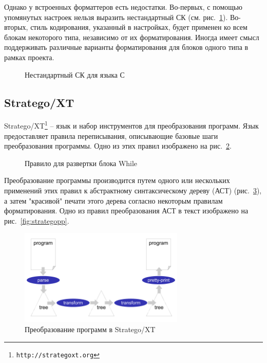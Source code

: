 Однако у встроенных форматтеров есть недостатки. Во-первых, с помощью упомянутых настроек нельзя выразить нестандартный СК (см. рис.~\ref{fig:unusualCC}). 
Во-вторых, стиль кодирования, указанный в настройках, будет применен ко всем блокам некоторого типа, независимо от их форматирования. 
Иногда имеет смысл поддерживать различные варианты форматирования для блоков одного типа в рамках проекта. %

\begin{figure}[h]
	\centering
	
	\caption{Нестандартный СК для языка С}
	\label{fig:unusualCC}
\end{figure}

\subsection{Stratego/XT}
Stratego/XT\footnote{\texttt{http://strategoxt.org}} -- язык и набор инструментов для преобразования программ. Язык предоставляет правила переписывания, описывающие базовые шаги преобразования программы\cite{stratego:xt}.
Одно из этих правил изображено на рис.~\ref{fig:rewriting}.

\begin{figure}[h]
	
	\caption{Правило для развертки блока While}
	\label{fig:rewriting}
\end{figure}

Преобразование программы производится путем одного или нескольких применений этих правил к абстрактному синтаксическому дереву (АСТ) (рис.~\ref{fig:stratego}), а затем "красивой" печати этого дерева согласно некоторым правилам форматирования. Одно из правил преобразования АСТ в текст изображено на рис.~\ref{fig:strategopp}.

\begin{figure}[h]
	\centering
	\includegraphics[width=0.7\textwidth]{images/pipe.jpg}
	\caption[Преобразование программ в Stratego/XT]{Преобразование программ в Stratego/XT\footnotemark}
	\label{fig:stratego}
\end{figure}


